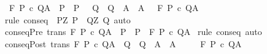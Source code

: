 \begin{isabellebody}
\ \ {\isachardoublequoteopen}{\isasymGamma}{\isacharcomma}{\isasymTheta}{\isasymturnstile}\isactrlbsub {\isacharslash}F\isactrlesub \ P{\isacharprime}\ c\ Q{\isacharprime}{\isacharcomma}A{\isacharprime}\ {\isasymLongrightarrow}\ P\ {\isasymsubseteq}\ P{\isacharprime}\ {\isasymLongrightarrow}\ \ Q{\isacharprime}\ {\isasymsubseteq}\ Q\ {\isasymLongrightarrow}\ A{\isacharprime}\ {\isasymsubseteq}\ A\ {\isasymLongrightarrow}\ \ {\isasymGamma}{\isacharcomma}{\isasymTheta}{\isasymturnstile}\isactrlbsub {\isacharslash}F\isactrlesub \ P\ c\ Q{\isacharcomma}A{\isachardoublequoteclose}\isanewline
%
\isadelimproof
\ \ %
\endisadelimproof
%
\isatagproof
{}\isamarkupfalse%
\ {\isacharparenleft}rule\ conseq\ {\isacharbrackleft}\ {\isacharquery}P{\isacharprime}{\isacharequal}{\isachardoublequoteopen}{\isasymlambda}Z{\isachardot}\ P{\isacharprime}{\isachardoublequoteclose}\ \ {\isacharquery}Q{\isacharprime}{\isacharequal}{\isachardoublequoteopen}{\isasymlambda}Z{\isachardot}\ Q{\isacharprime}{\isachardoublequoteclose}{\isacharbrackright}{\isacharparenright}\ auto%
\endisatagproof
{\isafoldproof}%
%
\isadelimproof
\isanewline
%
\endisadelimproof
\isanewline
{}\isamarkupfalse%
\ conseqPre\ {\isacharbrackleft}trans{\isacharbrackright}{\isacharcolon}\ {\isachardoublequoteopen}{\isasymGamma}{\isacharcomma}{\isasymTheta}{\isasymturnstile}\isactrlbsub {\isacharslash}F\isactrlesub \ P{\isacharprime}\ c\ Q{\isacharcomma}A\ {\isasymLongrightarrow}\ P\ {\isasymsubseteq}\ P{\isacharprime}\ {\isasymLongrightarrow}\ {\isasymGamma}{\isacharcomma}{\isasymTheta}{\isasymturnstile}\isactrlbsub {\isacharslash}F\isactrlesub \ P\ c\ Q{\isacharcomma}A{\isachardoublequoteclose}\isanewline
%
\isadelimproof
%
\endisadelimproof
%
\isatagproof
{}\isamarkupfalse%
\ {\isacharparenleft}rule\ conseq{\isacharparenright}\ auto%
\endisatagproof
{\isafoldproof}%
%
\isadelimproof
\isanewline
%
\endisadelimproof
\isanewline
{}\isamarkupfalse%
\ conseqPost\ {\isacharbrackleft}trans{\isacharbrackright}{\isacharcolon}\ {\isachardoublequoteopen}{\isasymGamma}{\isacharcomma}{\isasymTheta}{\isasymturnstile}\isactrlbsub {\isacharslash}F\isactrlesub \ P\ c\ Q{\isacharprime}{\isacharcomma}A{\isacharprime}\ {\isasymLongrightarrow}\ Q{\isacharprime}\ {\isasymsubseteq}\ Q\ {\isasymLongrightarrow}\ A{\isacharprime}\ {\isasymsubseteq}\ A\ \isanewline
\ {\isasymLongrightarrow}\ \ \ {\isasymGamma}{\isacharcomma}{\isasymTheta}{\isasymturnstile}\isactrlbsub {\isacharslash}F\isactrlesub \ P\ c\ Q{\isacharcomma}A{\isachardoublequoteclose}\isanewline

\end{isabellebody}
